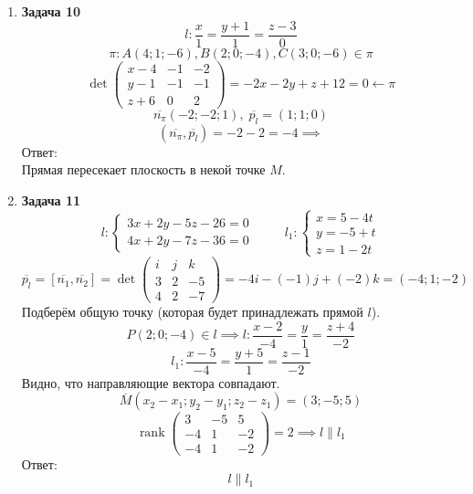 \documentclass{article}
\theoremstyle{plain}
\DeclareMathOperator{\rank}{rank}
\begin{document}
\begin{enumerate}
\item \textbf{Задача 10}
$$l : \frac{x}{1} = \frac{y + 1}{1} = \frac{z - 3}{0}$$
$$\pi : A(4; 1; -6), B(2; 0; -4), C(3; 0; -6) \in \pi$$
$$\det
    \begin {pmatrix}
    x - 4 & -1 & -2 \\
    y - 1 & -1 & -1 \\
    z + 6 & 0 & 2 
    \end{pmatrix}
    = -2x - 2y + z + 12 = 0 \leftarrow \pi
    $$
    $$ \overline{n_\pi} (-2; -2; 1),\; \overline{p_l} = (1; 1; 0)$$
    $$ (\overline{n_\pi}, \overline{p_l}) = -2 - 2 = -4 \implies$$
    Ответ: \\
    Прямая пересекает плоскость в некой точке $M$.
    \item \textbf{Задача 11}
    \begin{equation}
    l : 
        \begin{cases}
        3x + 2y - 5z - 26 = 0 \\
        4x + 2y - 7z  - 36 = 0
        \end{cases}
        \hspace{1cm}
        l_1 : 
        \begin{cases}
        x = 5 - 4t \\
        y = -5 + t \\
        z = 1 - 2t
        \end{cases}
    \end{equation}
    $$\overline{p_l} = [\overline{n_1}, \overline{n_2}] = \det \begin {pmatrix}
    i & j & k \\
    3 & 2 & -5 \\
    4 & 2 & -7
    \end{pmatrix} = -4i - (-1)j + (-2)k = (-4; 1; -2)$$
    Подберём общую точку (которая будет принадлежать прямой $l$).
    $$P(2; 0; -4) \in l\implies l : \frac{x - 2}{-4} = \frac{y}{1} = \frac{z + 4}{-2}$$
    $$l_1 : \frac{x - 5}{-4} = \frac{y + 5}{1} = \frac{z - 1}{-2}$$
    Видно, что направляющие вектора совпадают. 
    $$\overline{M}(x_2 - x_1; y_2 - y_1; z_2 - z_1) = (3; -5; 5)$$
    $$\rank \begin{pmatrix}
        3 & -5 & 5\\
        -4 & 1 & -2\\
        -4 & 1 & -2
    \end{pmatrix} = 2 \implies l \parallel l_1$$
    Ответ:
    $$l \parallel l_1 $$


\end{enumerate}
\end{document}
